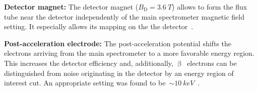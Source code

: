 {\par \textbf{Detector magnet:} The detector magnet ($B_\mathrm{D}=\SI{3.6}{T}$) allows to form the flux tube near the detector independently of the main spectrometer magnetic field setting. It especially allows its mapping on the the detector~\cite{Amsbaugh2015}.}

{\par \textbf{Post-acceleration electrode:} The post-acceleration potential shifts the electrons arriving from the main spectrometer to a more favorable energy region. This increases the detector efficiency and, additionally, $\upbeta$~electrons can be distinguished from noise originating in the detector by an energy region of interest cut. An appropriate setting was found to be~$\sim\SI{10}{keV}$~\cite{Amsbaugh2015}.}